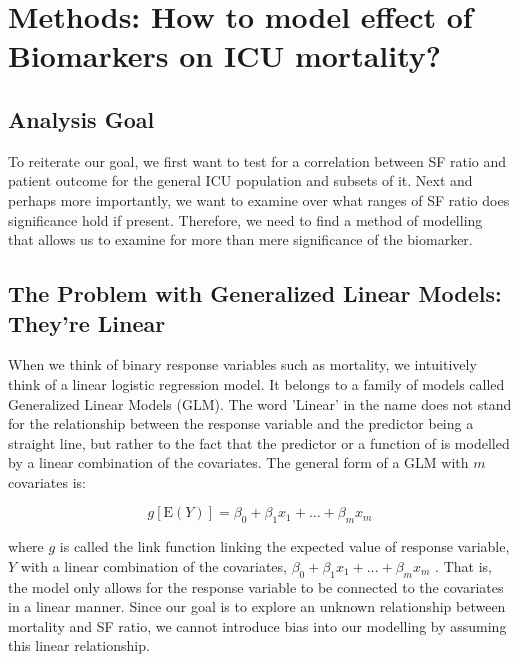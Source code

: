 
\chapter{Methods: How to model effect of Biomarkers on ICU mortality?} %

\label{Chapter3} %

\section{Analysis Goal}

To reiterate our goal, we first want to test for a correlation between SF ratio and patient outcome for the general ICU population and subsets of it. Next and perhaps more importantly, we want to examine over what ranges of SF ratio does significance hold if present. Therefore, we need to find a method of modelling that allows us to examine for more than mere significance of the biomarker. 

\section{The Problem with Generalized Linear Models: They're Linear}

When we think of binary response variables such as mortality, we intuitively think of a linear logistic regression model. It belongs to a family of models called Generalized Linear Models (GLM). The word 'Linear' in the name does not stand for the relationship between the response variable and the predictor being a straight line, but rather to the fact that the predictor or a function of is modelled by a linear combination of the covariates. The general form of a GLM with $m$ covariates is: 

\begin{equation*}
g[\mathrm{E}(Y)]=\beta_{0}+\beta_{1} x_{1}+\ldots+\beta_{m} x_{m}
\end{equation*}

where $g$ is called the link function linking the expected value of response variable, $Y$ with a linear combination of the covariates, $
\beta_{0}+\beta_{1} x_{1}+\ldots+\beta_{m} x_{m}$ \citep{wood2017generalized}. That is, the model only allows for the response variable to be connected to the covariates in a linear manner. Since our goal is to explore an unknown relationship between mortality and SF ratio, we cannot introduce bias into our modelling by assuming this linear relationship. 

